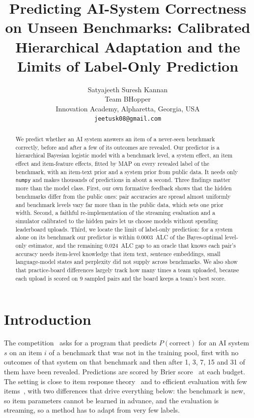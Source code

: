 \documentclass{article}
\title{Predicting AI-System Correctness on Unseen Benchmarks: Calibrated Hierarchical Adaptation and the Limits of Label-Only Prediction}
\author{%
  Satyajeeth Suresh Kannan\\
  Team BHopper\\
  Innovation Academy, Alpharetta, Georgia, USA\\
  \texttt{jeetusk08@gmail.com}
}
\begin{document}
\maketitle

\begin{abstract}
We predict whether an AI system answers an item of a never-seen benchmark correctly, before and after a few of its outcomes are
revealed. Our predictor is a hierarchical Bayesian logistic model with a benchmark level, a system effect, an item effect and
item-feature effects, fitted by MAP on every revealed label of the benchmark, with an item-text prior and a system prior from public
data. It needs only \texttt{numpy} and makes thousands of predictions in about a second. Three findings matter more than the model
class. First, our own formative feedback shows that the hidden benchmarks differ from the public ones: pair accuracies are spread
almost uniformly and benchmark levels vary far more than in the public data, which sets one prior width. Second, a faithful
re-implementation of the streaming evaluation and a simulator calibrated to the hidden pairs let us choose models without spending
leaderboard uploads. Third, we locate the limit of label-only prediction: for a system alone on its benchmark our predictor is within
0.0003~ALC of the Bayes-optimal level-only estimator, and the remaining 0.024~ALC gap to an oracle that knows each pair's accuracy
needs item-level knowledge that item text, sentence embeddings, small language-model states and perplexity did not supply across
benchmarks. We also show that practice-board differences largely track how many times a team uploaded, because each upload is
scored on 9 sampled pairs and the board keeps a team's best score.
\end{abstract}

\section{Introduction}

The competition~\cite{paiec} asks for a program that predicts $P(\text{correct})$ for an AI system $s$ on an item $i$ of a benchmark that was
not in the training pool, first with no outcomes of that system on that benchmark and then after 1, 3, 7, 15 and 31 of them have been
revealed. Predictions are scored by Brier score~\cite{brier1950} at each budget. The setting is close to item response
theory~\cite{rasch1960} and to efficient evaluation with few items~\cite{polo2024tiny}, with two differences that drive everything
below: the benchmark is new, so item parameters cannot be learned in advance, and the evaluation is streaming, so a method
has to adapt from very few labels.
\end{document}
